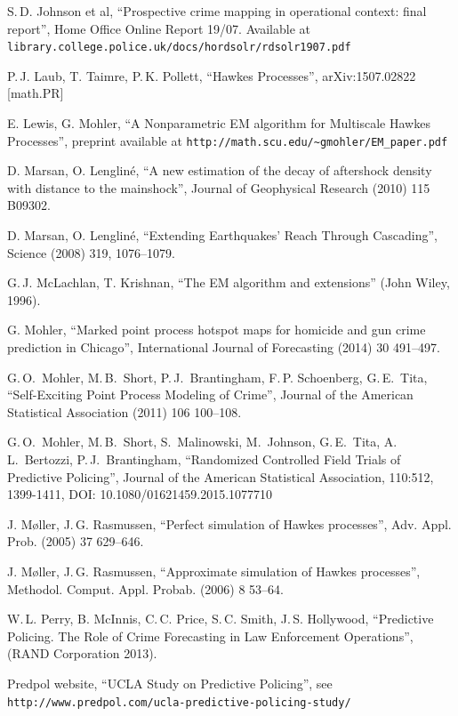 \documentclass[twoside,a4paper]{article}
\theoremstyle{plain}
\theoremstyle{definition}
\begin{document}
\begin{thebibliography}{99}
 S.\,D. Johnson et al,
	``Prospective crime mapping in operational context: final report'',
	Home Office Online Report 19/07.  Available at
	\texttt{library.college.police.uk/docs/hordsolr/rdsolr1907.pdf}

 P.\,J. Laub, T. Taimre, P.\,K. Pollett,
	``Hawkes Processes'', arXiv:1507.02822 [math.PR]

 E. Lewis, G. Mohler,
	``A Nonparametric EM algorithm for Multiscale Hawkes Processes'',
	preprint available at \texttt{http://math.scu.edu/\textasciitilde gmohler/EM\_paper.pdf}

 D. Marsan, O. Lenglin\'e,
	``A new estimation of the decay of aftershock density with distance to the mainshock'',
	Journal of Geophysical Research (2010) 115 B09302.

 D. Marsan, O. Lenglin\'e,
	``Extending Earthquakes' Reach Through Cascading'',
	Science (2008) 319, 1076--1079.

 G.\,J. McLachlan, T. Krishnan, ``The EM algorithm and extensions''
	(John Wiley, 1996).
	
 G. Mohler, ``Marked point process hotspot maps for homicide and
gun crime prediction in Chicago'',
	International Journal of Forecasting (2014) 30 491--497.

 G.\,O.~Mohler, M.\,B.~Short, P.\,J.~Brantingham, F.\,P. Schoenberg, G.\,E.~Tita,
	``Self-Exciting Point Process Modeling of Crime'',
	Journal of the American Statistical Association (2011) 106 100--108.

 G.\,O.~Mohler, M.\,B.~Short, S.~Malinowski, M.~Johnson, G.\,E.~Tita, 
   A.\,L.~Bertozzi, P.\,J.~Brantingham,
   ``Randomized Controlled Field Trials of Predictive Policing'',
   Journal of the American Statistical Association, 110:512, 1399-1411, DOI:
	10.1080/01621459.2015.1077710

 J. M\o ller, J.\,G. Rasmussen,
	``Perfect simulation of Hawkes processes'',
	Adv. Appl. Prob. (2005) 37 629--646.

 J. M\o ller, J.\,G. Rasmussen,
	``Approximate simulation of Hawkes processes'',
	Methodol. Comput. Appl. Probab. (2006) 8 53--64.

 W.\,L. Perry, B. McInnis, C.\,C. Price, S.\,C. Smith, J.\,S. Hollywood,
        ``Predictive Policing. The Role of Crime Forecasting in Law Enforcement Operations'',
        (RAND Corporation 2013).

 Predpol website, ``UCLA Study on Predictive Policing'',
	see \texttt{http://www.predpol.com/ucla-predictive-policing-study/}


\end{thebibliography}
\end{document}
